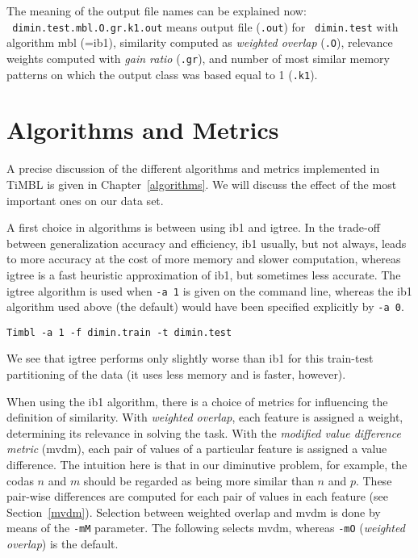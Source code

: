 \documentclass{report}
\begin{document}
The meaning of the output file names can be explained now:\\ {\tt
dimin.test.mbl.O.gr.k1.out} means output file ({\tt .out}) for {\tt
dimin.test} with algorithm {\sc mbl} (={\sc ib1}), similarity computed
as {\em weighted overlap} ({\tt .O}), relevance weights computed with
{\em gain ratio} ({\tt .gr}), and number of most similar memory
patterns on which the output class was based equal to 1 ({\tt .k1}).

\section{Algorithms and Metrics}

A precise discussion of the different algorithms and metrics
implemented in TiMBL is given in Chapter~\ref{algorithms}. We will
discuss the effect of the most important ones on our data set.

A first choice in algorithms is between using {\sc ib1} and {\sc
igtree}. In the trade-off between generalization accuracy and
efficiency, {\sc ib1} usually, but not always, leads to more accuracy
at the cost of more memory and slower computation, whereas {\sc
igtree} is a fast heuristic approximation of {\sc ib1}, but sometimes
less accurate. The {\sc igtree} algorithm is used when {\tt -a 1} is
given on the command line, whereas the {\sc ib1} algorithm used above
(the default) would have been specified explicitly by {\tt -a 0}. 

{\small
\begin{verbatim}
Timbl -a 1 -f dimin.train -t dimin.test
\end{verbatim}} 

We see that {\sc igtree} performs only slightly worse than {\sc ib1}
for this train-test partitioning of the data (it uses less memory and
is faster, however). 

When using the {\sc ib1} algorithm, there is a choice of metrics for
influencing the definition of similarity. With {\em weighted overlap},
each feature is assigned a weight, determining its relevance in
solving the task. With the {\em modified value difference metric}
({\sc mvdm}), each pair of values of a particular feature is assigned
a value difference. The intuition here is that in our diminutive
problem, for example, the codas $n$ and $m$ should be regarded as
being more similar than $n$ and $p$. These pair-wise differences are
computed for each pair of values in each feature (see
Section~\ref{mvdm}). Selection between weighted overlap and {\sc mvdm}
is done by means of the {\tt -mM} parameter. The following selects {\sc
mvdm}, whereas {\tt -mO} ({\em weighted overlap}) is the default.
\end{document}
